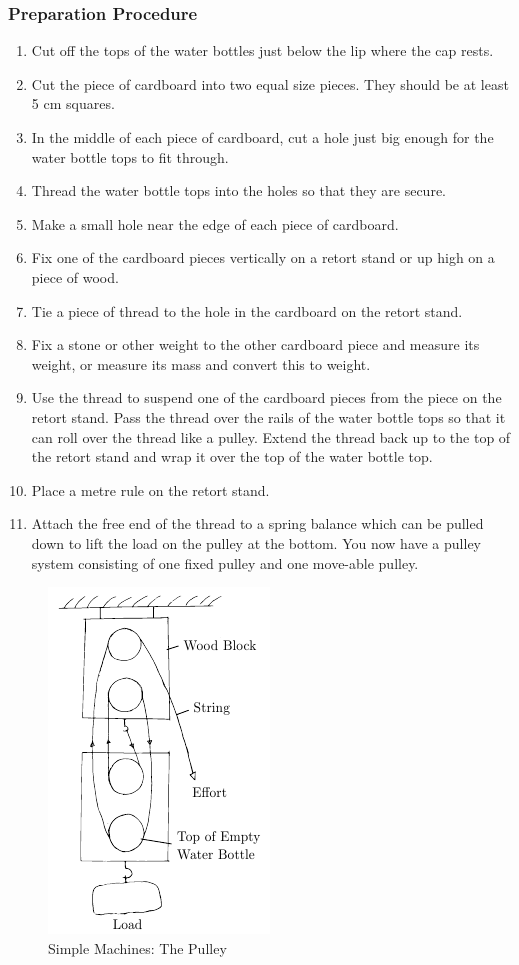 \subsubsection*{Preparation Procedure}
\begin{enumerate}
\item{Cut off the tops of the water bottles just below the lip where the cap rests.}
\item{Cut the piece of cardboard into two equal size pieces.  They should be at least 5 cm squares.}
\item{In the middle of each piece of cardboard, cut a hole just big enough for the water bottle tops to fit through.}
\item{Thread the water bottle tops into the holes so that they are secure.}
\item{Make a small hole near the edge of each piece of cardboard.}
\item{Fix one of the cardboard pieces vertically on a retort stand or up high on a piece of wood.}
\item{Tie a piece of thread to the hole in the cardboard on the retort stand.}
\item{Fix a stone or other weight to the other cardboard piece and measure its weight, or measure its mass and convert this to weight.}
\item{Use the thread to suspend one of the cardboard pieces from the piece on the retort stand.  Pass the thread over the rails of the water bottle tops so that it can roll over the thread like a pulley.  Extend the thread back up to the top of the retort stand and wrap it over the top of the water bottle top.}
\item{Place a metre rule on the retort stand.}
\item{Attach the free end of the thread to a spring balance which can be pulled down to lift the load on the pulley at the bottom.  You now have a pulley system consisting of one fixed pulley and one move-able pulley.}
\end{enumerate}

\begin{figure}
\begin{center}
\includegraphics{./img/block-n-tackle.png}
\caption{Simple Machines: The Pulley}
\label{fig:block-n-tackle}
\end{center}
\end{figure}

